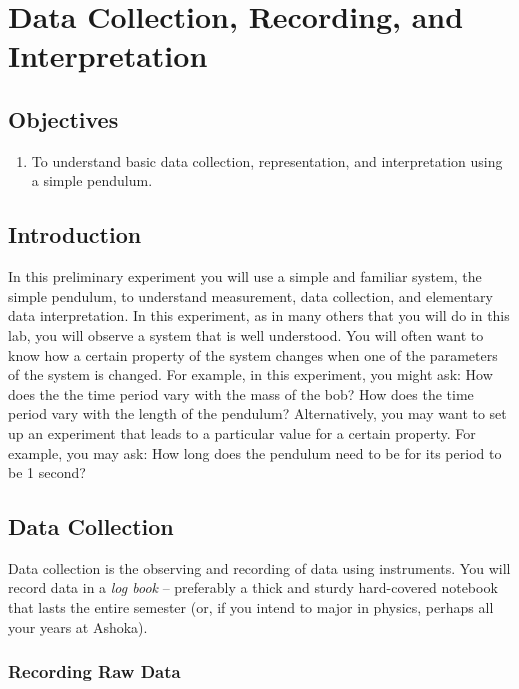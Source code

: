 \chapter{Data Collection, Recording, and Interpretation}

\section{Objectives}

\begin{enumerate}
    \item To understand basic data collection, representation, and interpretation using a simple pendulum.
\end{enumerate}

\section{Introduction}

In this preliminary experiment you will use a simple and familiar system, the simple pendulum, to understand measurement, data collection, and elementary data interpretation. In this experiment, as in many others that you will do in this lab, you will observe a system that is well understood. You will often want to know how a certain property of the system changes when one of the parameters of the system is changed. For example, in this experiment, you might ask: How does the the time period vary with the mass of the bob? How does the time period vary with the length of the pendulum? Alternatively, you may want to set up an experiment that leads to a particular value for a certain property. For example, you may ask: How long does the pendulum need to be for its period to be 1 second?

\section{Data Collection}

Data collection is the observing and recording of data using instruments. You will record data in a \textit{log book} -- preferably a thick and sturdy hard-covered notebook that lasts the entire semester (or, if you intend to major in physics, perhaps all your years at Ashoka).

\subsection{Recording Raw Data}

